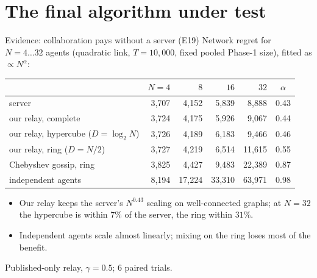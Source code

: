 \documentclass[11pt]{beamer}
\begin{document}
\section{The final algorithm under test}


\begin{frame}{Evidence: collaboration pays without a server (E19)}
\footnotesize
Network regret for $N=4\ldots32$ agents (quadratic link, $T=10{,}000$, fixed pooled Phase-1 size), fitted as $\propto N^{\alpha}$:
\vspace{0.4em}
\begin{center}
\renewcommand{\arraystretch}{1.15}
\begin{tabular}{lrrrrc}
\toprule
& $N=4$ & $8$ & $16$ & $32$ & $\alpha$\\
\midrule
server & 3,707 & 4,152 & 5,839 & 8,888 & 0.43\\
\alert{our relay, complete} & 3,724 & 4,175 & 5,926 & 9,067 & 0.44\\
\alert{our relay, hypercube} ($D=\log_2N$) & 3,726 & 4,189 & 6,183 & 9,466 & 0.46\\
\alert{our relay, ring} ($D=N/2$) & 3,727 & 4,219 & 6,514 & 11,615 & 0.55\\
Chebyshev gossip, ring & 3,825 & 4,427 & 9,483 & 22,389 & 0.87\\
independent agents & 8,194 & 17,224 & 33,310 & 63,971 & 0.98\\
\bottomrule
\end{tabular}
\end{center}
\begin{itemize}
\item Our relay keeps the server's $N^{0.43}$ scaling on well-connected graphs; at $N=32$ the hypercube is within $7\%$ of the server, the ring within $31\%$.
\item Independent agents scale almost linearly; mixing on the ring loses most of the benefit.
\end{itemize}
{\tiny Published-only relay, $\gamma=0.5$; 6 paired trials.}
\end{frame}
\end{document}
